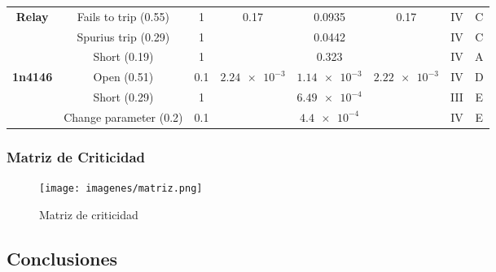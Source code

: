 \documentclass{article}
\begin{document}
\begin{table}[H]
{\begin{tabular}{@{}|c|c|c|c|c|c|c|c|@{}}
\multirow{3}{*}{\textbf{Relay}} & Fails to trip (0.55) & 1 & \multirow{3}{*}{0.17} & 0.0935 & \multirow{3}{*}{0.17} & IV & C \\ \cmidrule(lr){2-3} \cmidrule(lr){5-5} \cmidrule(l){7-8} 
 & Spurius trip (0.29) & 1 &  & 0.0442 &  & IV & C \\ \cmidrule(lr){2-3} \cmidrule(lr){5-5} \cmidrule(l){7-8} 
 & Short (0.19) & 1 &  & 0.323 &  & IV & A \\ \midrule
\multirow{3}{*}{\textbf{1n4146}} & Open (0.51) & 0.1 & \multirow{3}{*}{$\num{2.24e-3}$} & $\num{1.14e-3}$ & \multirow{3}{*}{$\num{2.22e-3}$} & IV & D \\ \cmidrule(lr){2-3} \cmidrule(lr){5-5} \cmidrule(l){7-8} 
 & Short (0.29) & 1 &  & $\num{6.49e-4}$ &  & III & E \\ \cmidrule(lr){2-3} \cmidrule(lr){5-5} \cmidrule(l){7-8} 
 & Change parameter (0.2) & 0.1 &  & $\num{4.4e-4}$ &  & IV & E \\ \bottomrule
\end{tabular}%
}
\end{table}

\clearpage

\subsubsection {Matriz de Criticidad}

\begin{figure}[h]
 \centering
	\texttt{[image: imagenes/matriz.png]} 
	\caption{Matriz de criticidad}
\end{figure}

\subsection {Conclusiones}
\end{document}
